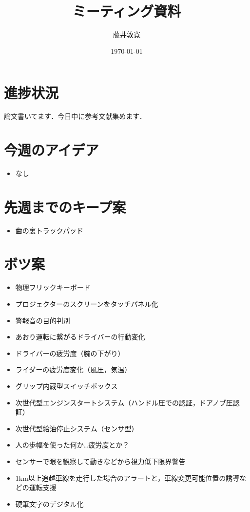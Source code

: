 \documentclass[a4j,twocolumn,10pt]{jarticle}
\title{ミーティング資料}
\author{藤井敦寛}
\date{\today}
\begin{document}
\maketitle

\section{進捗状況}
論文書いてます．今日中に参考文献集めます．

\section{今週のアイデア}
\begin{itemize}
  \item なし
\end{itemize}

\section{先週までのキープ案}
\begin{itemize}
  \item 歯の裏トラックパッド
\end{itemize}


\section{ボツ案}
\begin{itemize}
  \item 物理フリックキーボード
  \item プロジェクターのスクリーンをタッチパネル化
  \item 警報音の目的判別
  \item あおり運転に繋がるドライバーの行動変化
  \item ドライバーの疲労度（腕の下がり）
  \item ライダーの疲労度変化（風圧，気温）
  \item グリップ内蔵型スイッチボックス
  \item 次世代型エンジンスタートシステム（ハンドル圧での認証，ドアノブ圧認証）
  \item 次世代型給油停止システム（センサ型）
  \item 人の歩幅を使った何か…疲労度とか？
  \item センサーで眼を観察して動きなどから視力低下限界警告
  \item 1km以上追越車線を走行した場合のアラートと，車線変更可能位置の誘導などの運転支援
  \item 硬筆文字のデジタル化
\end{itemize}
\end{document}
